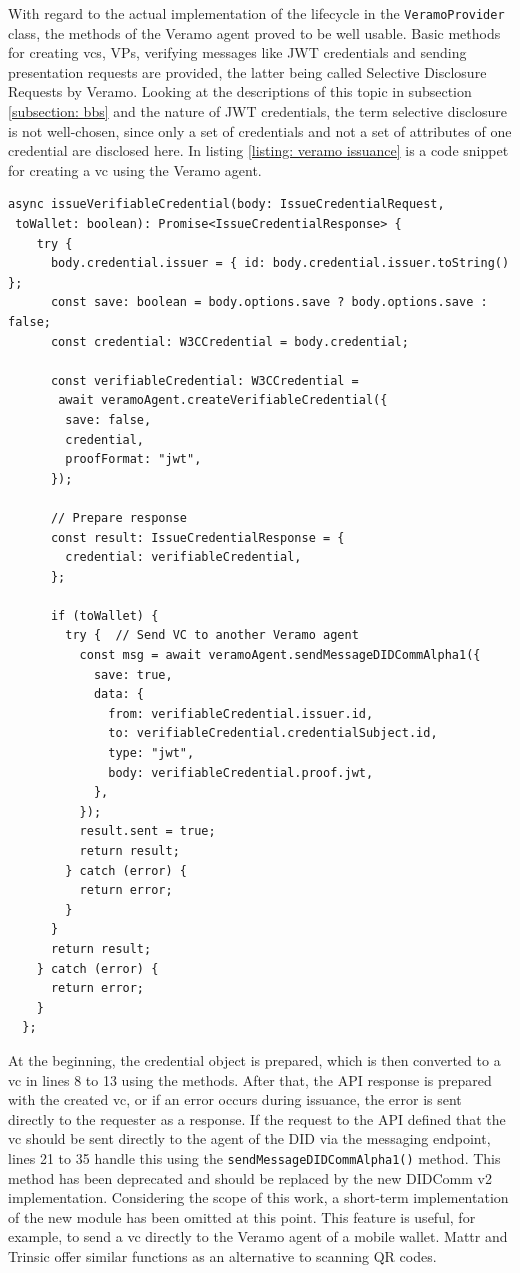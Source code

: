     With regard to the actual implementation of the lifecycle in the \texttt{VeramoProvider} class, the methods of the Veramo agent proved to be well usable. Basic methods for creating \acp{vc}, \acp{VP}, verifying messages like JWT credentials and sending presentation requests are provided, the latter being called Selective Disclosure Requests by Veramo. Looking at the descriptions of this topic in subsection \ref{subsection: bbs} and the nature of JWT credentials, the term selective disclosure is not well-chosen, since only a set of credentials and not a set of attributes of one credential are disclosed here. In listing \ref{listing: veramo issuance} is a code snippet for creating a \ac{vc} using the Veramo agent.
    \newline
        \begin{lstlisting}[style=ES6, caption=Issue a \acs{vc} with Veramo, label={listing: veramo issuance}]
async issueVerifiableCredential(body: IssueCredentialRequest, 
 toWallet: boolean): Promise<IssueCredentialResponse> {
    try {
      body.credential.issuer = { id: body.credential.issuer.toString() };
      const save: boolean = body.options.save ? body.options.save : false;
      const credential: W3CCredential = body.credential;
      
      const verifiableCredential: W3CCredential = 
       await veramoAgent.createVerifiableCredential({
        save: false,
        credential,
        proofFormat: "jwt",
      });

      // Prepare response
      const result: IssueCredentialResponse = {
        credential: verifiableCredential,
      };

      if (toWallet) {
        try {  // Send VC to another Veramo agent
          const msg = await veramoAgent.sendMessageDIDCommAlpha1({
            save: true,
            data: {
              from: verifiableCredential.issuer.id,
              to: verifiableCredential.credentialSubject.id,
              type: "jwt",
              body: verifiableCredential.proof.jwt,
            },
          });
          result.sent = true;
          return result;
        } catch (error) {
          return error;
        }
      }
      return result;
    } catch (error) {
      return error;
    }
  };\end{lstlisting}
    
        At the beginning, the credential object is prepared, which is then converted to a \ac{vc} in lines 8 to 13 using the methods. After that, the API response is prepared with the created \ac{vc}, or if an error occurs during issuance, the error is sent directly to the requester as a response. If the request to the API defined that the \ac{vc} should be sent directly to the agent of the \ac{DID} via the messaging endpoint, lines 21 to 35 handle this using the \texttt{sendMessageDIDCommAlpha1()} method. This method has been deprecated and should be replaced by the new DIDComm v2 implementation. Considering the scope of this work, a short-term implementation of the new module has been omitted at this point. This feature is useful, for example, to send a \ac{vc} directly to the Veramo agent of a mobile wallet. Mattr and Trinsic offer similar functions as an alternative to scanning QR codes.
    

